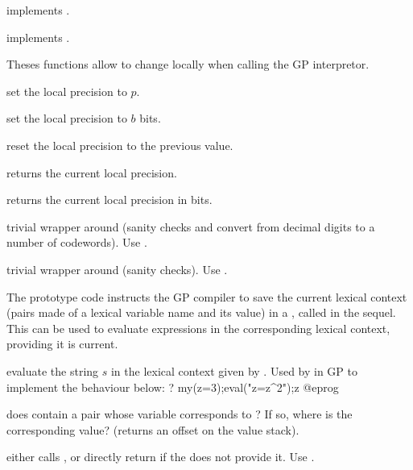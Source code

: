 implements \kbd{[x<-b,c(x)]}.

implements \kbd{[a(x)|x<-b,c(x)]}.


Theses functions allow to change  locally when
calling the GP interpretor.

 set the local precision to $p$.

 set the local precision to $b$ bits.

 reset the local precision to the previous
value.

 returns the current local precision.

 returns the current local precision in bits.

 trivial wrapper around 
(sanity checks and convert from decimal digits to a number of codewords).
Use .

 trivial wrapper around 
(sanity checks). Use .


The prototype code  instructs the GP compiler to save the current
lexical context (pairs made of a lexical variable name and its value)
in a , called  in the sequel. This  can be used
to evaluate expressions in the corresponding lexical context, providing it is
current.

 evaluate the string $s$
in the lexical context given by .  Used by  in GP
to implement the behaviour below:
\bprog
? my(z=3);eval("z=z^2");z
@eprog

 does  contain
a pair whose variable corresponds to ? If so, where is the
corresponding value? (returns an offset on the value stack).


 either calls , or directly
return  if the  does not provide it. Use .

